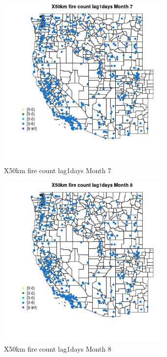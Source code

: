 \begin{figure} 
\centering  
\includegraphics[width=0.77\textwidth]{Code_Outputs/Report_ML_input_PM25_Step4_part_e_de_duplicated_aves_compiled_2019-05-14wNAs_MapObsMo7X50km_fire_count_lag1days.jpg} 
\caption{\label{fig:Report_ML_input_PM25_Step4_part_e_de_duplicated_aves_compiled_2019-05-14wNAsMapObsMo7X50km_fire_count_lag1days}X50km fire count lag1days Month 7} 
\end{figure} 
 

\begin{figure} 
\centering  
\includegraphics[width=0.77\textwidth]{Code_Outputs/Report_ML_input_PM25_Step4_part_e_de_duplicated_aves_compiled_2019-05-14wNAs_MapObsMo8X50km_fire_count_lag1days.jpg} 
\caption{\label{fig:Report_ML_input_PM25_Step4_part_e_de_duplicated_aves_compiled_2019-05-14wNAsMapObsMo8X50km_fire_count_lag1days}X50km fire count lag1days Month 8} 
\end{figure} 
 

